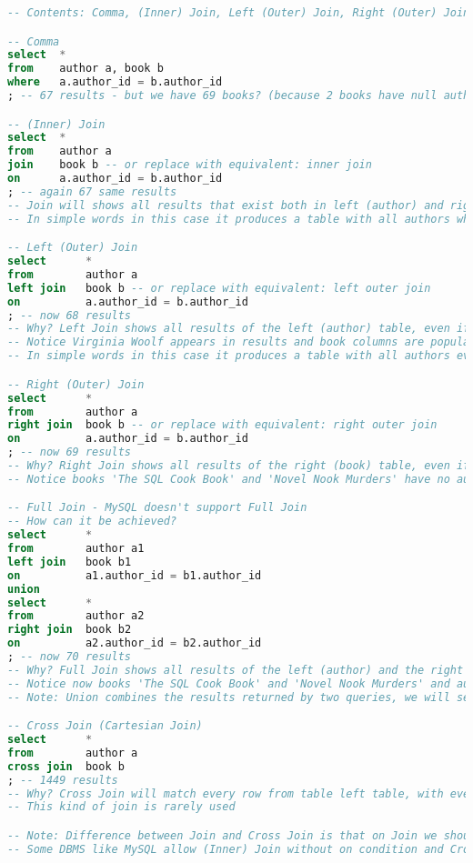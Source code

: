 \begin{lstlisting}[language=SQL]
-- Contents: Comma, (Inner) Join, Left (Outer) Join, Right (Outer) Join,, FUll (Outer) Join, Cross Join

-- Comma
select	*
from	author a, book b
where	a.author_id = b.author_id
; -- 67 results - but we have 69 books? (because 2 books have null author_id)

-- (Inner) Join
select	*
from	author a
join	book b -- or replace with equivalent: inner join
on		a.author_id = b.author_id
; -- again 67 same results
-- Join will shows all results that exist both in left (author) and right (book) table
-- In simple words in this case it produces a table with all authors who have at least one book and their books

-- Left (Outer) Join
select		*
from		author a
left join	book b -- or replace with equivalent: left outer join
on			a.author_id = b.author_id
; -- now 68 results
-- Why? Left Join shows all results of the left (author) table, even if there is no match in right (book) table
-- Notice Virginia Woolf appears in results and book columns are populated with null, since she has no book associated with her
-- In simple words in this case it produces a table with all authors even if they don't have any book and their books

-- Right (Outer) Join
select		*
from		author a
right join	book b -- or replace with equivalent: right outer join
on			a.author_id = b.author_id
; -- now 69 results
-- Why? Right Join shows all results of the right (book) table, even if there is no match in left (author) table
-- Notice books 'The SQL Cook Book' and 'Novel Nook Murders' have no author details, because we didn't associate them with any author

-- Full Join - MySQL doesn't support Full Join
-- How can it be achieved?
select		*
from		author a1
left join	book b1
on			a1.author_id = b1.author_id
union
select		*
from		author a2
right join	book b2
on			a2.author_id = b2.author_id
; -- now 70 results
-- Why? Full Join shows all results of the left (author) and the right (book) table, even if there is no match in the other table
-- Notice now books 'The SQL Cook Book' and 'Novel Nook Murders' and author Virginia Woolf show in results even though they have no much
-- Note: Union combines the results returned by two queries, we will see it better later

-- Cross Join (Cartesian Join)
select		*
from		author a
cross join	book b
; -- 1449 results
-- Why? Cross Join will match every row from table left table, with every row from table right table
-- This kind of join is rarely used

-- Note: Difference between Join and Cross Join is that on Join we should use on to define how rows will be matched from one table with the other ones while Cross Join there should be no on conditions
-- Some DBMS like MySQL allow (Inner) Join without on condition and Cross Join with on
\end{lstlisting}
